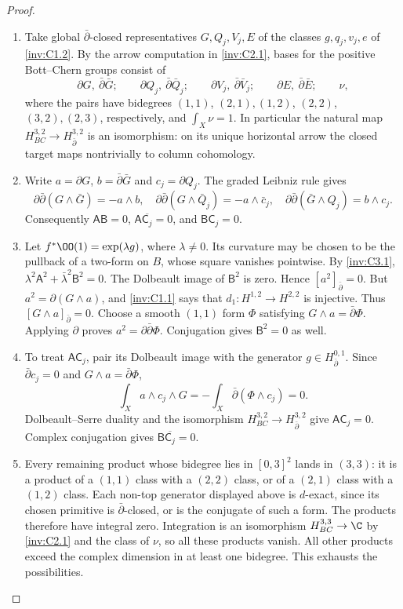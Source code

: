 \begin{proof}
\begin{enumerate}[label=\arabic*.,leftmargin=*]
\item Take global $\bar\partial$-closed representatives $G,Q_j,V_j,E$
of the classes $g,q_j,v_j,e$ of \ref{inv:C1.2}.  By the arrow computation in
\ref{inv:C2.1}, bases for the positive Bott--Chern groups consist of
\[
\partial G,\ \bar\partial\bar G;\qquad
\partial Q_j,\ \bar\partial\bar Q_j;\qquad
\partial V_j,\ \bar\partial\bar V_j;\qquad
\partial E,\ \bar\partial\bar E;\qquad \nu,
\]
where the pairs have bidegrees $(1,1)$, $(2,1),(1,2)$,
$(2,2)$, $(3,2),(2,3)$, respectively, and
$\int_X\nu=1$.  In particular the natural map
$H^{3,2}_{BC}\to H^{3,2}_{\bar\partial}$ is an isomorphism:
on its unique horizontal arrow the closed target maps nontrivially
to column cohomology.

\item Write $a=\partial G$, $b=\bar\partial\bar G$ and
$c_j=\partial Q_j$.  The graded Leibniz rule gives
\[
\partial\bar\partial(G\wedge\bar G)=-a\wedge b,
\quad
\partial\bar\partial(G\wedge\bar Q_j)
=-a\wedge\bar c_j,
\quad
\partial\bar\partial(\bar G\wedge Q_j)=b\wedge c_j.
\]
Consequently $\mathsf A\mathsf B=0$,
$\mathsf A\overline{\mathsf C_j}=0$, and
$\mathsf B\mathsf C_j=0$.

\item Let $f^*\OO(1)=\exp(\lambda g)$, where $\lambda\ne0$.
Its curvature may be chosen to be the pullback of a two-form on $B$,
whose square vanishes pointwise.  By \ref{inv:C3.1},
$\lambda^2\mathsf A^2+\bar\lambda^2\mathsf B^2=0$.
The Dolbeault image of $\mathsf B^2$ is zero.  Hence
$[a^2]_{\bar\partial}=0$.  But
$a^2=\partial(G\wedge a)$, and \ref{inv:C1.1} says that
$d_1:H^{1,2}\to H^{2,2}$ is injective.  Thus
$[G\wedge a]_{\bar\partial}=0$.  Choose a smooth $(1,1)$ form
$\Phi$ satisfying $G\wedge a=\bar\partial\Phi$.  Applying
$\partial$ proves $a^2=\partial\bar\partial\Phi$.
Conjugation gives $\mathsf B^2=0$ as well.

\item To treat $\mathsf A\mathsf C_j$, pair its Dolbeault image with the
generator $g\in H^{0,1}_{\bar\partial}$.  Since
$\bar\partial c_j=0$ and $G\wedge a=\bar\partial\Phi$,
\[
\int_X a\wedge c_j\wedge G
=-\int_X\bar\partial(\Phi\wedge c_j)=0.
\]
Dolbeault--Serre duality and the isomorphism
$H^{3,2}_{BC}\to H^{3,2}_{\bar\partial}$ give
$\mathsf A\mathsf C_j=0$.  Complex conjugation gives
$\mathsf B\overline{\mathsf C_j}=0$.

\item Every remaining product whose bidegree lies in $[0,3]^2$ lands in
$(3,3)$: it is a product of a $(1,1)$ class with a $(2,2)$ class,
or of a $(2,1)$ class with a $(1,2)$ class.  Each non-top generator
displayed above is $d$-exact, since its chosen primitive is
$\bar\partial$-closed, or is the conjugate of such a form.
The products therefore have integral zero.  Integration is an
isomorphism $H^{3,3}_{BC}\to\C$ by \ref{inv:C2.1} and the class of $\nu$,
so all these products vanish.  All other products exceed the complex
dimension in at least one bidegree.  This exhausts the possibilities.
\end{enumerate}
\end{proof}

